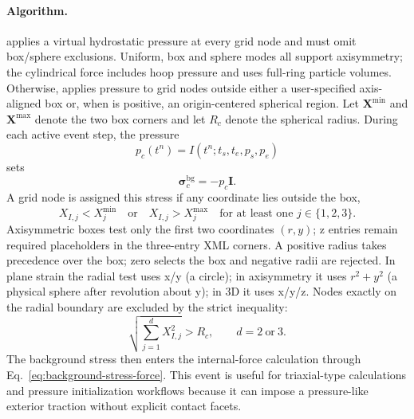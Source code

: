 \paragraph{Algorithm.}
 applies a virtual hydrostatic pressure at every grid node and must omit box/sphere exclusions. Uniform, box and sphere modes all support axisymmetry; the cylindrical force includes hoop pressure and uses full-ring particle volumes. Otherwise,  applies pressure to grid nodes outside either a user-specified axis-aligned box or, when  is positive, an origin-centered spherical region. Let $\mathbf{X}^{\min}$ and $\mathbf{X}^{\max}$ denote the two box corners and let $R_c$ denote the spherical radius. During each active event step, the pressure
\begin{equation}
  p_c(t^n)=I(t^n;t_s,t_e,p_s,p_e)
\end{equation}
sets
\begin{equation}
  \boldsymbol{\sigma}^{\mathrm{bg}}_c=-p_c\mathbf{I}.
\end{equation}
A grid node is assigned this stress if any coordinate lies outside the box,
\begin{equation}
  X_{I,j}<X^{\min}_j\quad \text{or}\quad X_{I,j}>X^{\max}_j
  \quad \text{for at least one } j\in\{1,2,3\}.
\end{equation}
Axisymmetric boxes test only the first two coordinates $(r,y)$; z entries remain required placeholders in the three-entry XML corners. A positive radius takes precedence over the box; zero selects the box and negative radii are rejected. In plane strain the radial test uses x/y (a circle); in axisymmetry it uses $r^2+y^2$ (a physical sphere after revolution about y); in 3D it uses x/y/z. Nodes exactly on the radial boundary are excluded by the strict inequality:
\begin{equation}
  \sqrt{\sum_{j=1}^{d} X_{I,j}^2} > R_c,\qquad d=2\ \text{or}\ 3.
\end{equation}
The background stress then enters the internal-force calculation through Eq.~\eqref{eq:background-stress-force}.  This event is useful for triaxial-type calculations and pressure initialization workflows because it can impose a pressure-like exterior traction without explicit contact facets.

